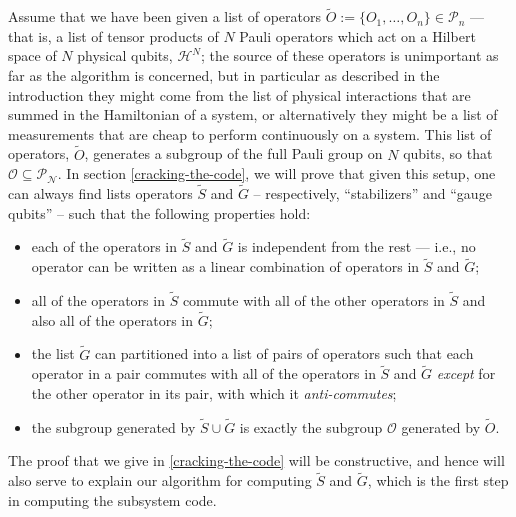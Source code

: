 \documentclass[twocolumn,showpacs,preprintnumbers,amsmath,amssymb,nofootinbib,pra,floatfix]{revtex4}
\begin{document}
Assume that we have been given a list of operators $\tilde O :=\{O_1,\dots,O_n\}\in \mathcal{P}_n$ --- that is, a list of tensor products of $N$ Pauli operators which act on a Hilbert space of $N$ physical qubits, $\mathscr{H}^N$;  the source of these operators is unimportant as far as the algorithm is concerned, but in particular as described in the introduction they might come from the list of physical interactions that are summed in the Hamiltonian of a system, or alternatively they might be a list of measurements that are cheap to perform continuously on a system.  This list of operators, $\tilde O$, generates a subgroup of the full Pauli group on $N$ qubits, so that $\mathcal{O}\subseteq\mathcal{P_N}$.  In section \ref{cracking-the-code}, we will prove that given this setup, one can always find lists operators $\tilde S$ and $\tilde G$ -- respectively, ``stabilizers'' and ``gauge qubits'' -- such that the following properties hold:
\begin{itemize}
\item each of the operators in $\tilde S$ and $\tilde G$ is independent from the rest --- i.e., no operator can be written as a linear combination of operators in $\tilde S$ and $\tilde G$;
\item all of the operators in $\tilde S$ commute with all of the other operators in $\tilde S$ and also all of the operators in $\tilde G$;
\item the list $\tilde G$ can partitioned into a list of pairs of operators such that each operator in a pair commutes with all of the operators in $\tilde S$ and $\tilde G$ \emph{except} for the other operator in its pair, with which it \emph{anti-commutes};
\item the subgroup generated by $\tilde S \cup \tilde G$ is exactly the subgroup $\mathcal{O}$ generated by $\tilde O$.
\end{itemize}
The proof that we give in \ref{cracking-the-code} will be constructive, and hence will also serve to explain our algorithm for computing $\tilde S$ and $\tilde G$, which is the first step in computing the subsystem code.
\end{document}
